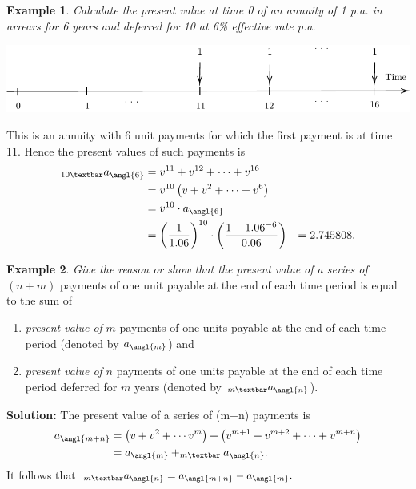 \documentclass[
]{book}
\theoremstyle{definition}
\theoremstyle{definition}
\newtheorem{example}{Example}[chapter]
\theoremstyle{definition}
\theoremstyle{definition}
\theoremstyle{remark}
\begin{document}
\begin{example}
\emph{Calculate the present value at time 0 of an annuity of 1 p.a. in
arrears for 6 years and deferred for 10 at 6\% effective rate p.a.}
\end{example}

\begin{center}\includegraphics{SCMA266Bookdownproj_files/figure-latex/tikz-ex18-1} \end{center}

This is an annuity with 6 unit payments for which the first payment is
at time 11. Hence the present values of such payments is
\[\begin{aligned}
    _{10 \textbar}a_\angl{6}
  &= v^{11} + v^{12} + \cdots +v^{16}  \\
    &= v^{10}  \left( v + v^2 + \cdots + v^6  \right) \\
    &= v^{10} \cdot  a_\angl{6} \\
    &= \left(\frac{1}{1.06}\right)^{10} \cdot \left( \frac{1- 1.06^{-6}}{0.06} \right)
    &= 2.745808.\end{aligned}\]

\begin{example}

\emph{Give the reason or show that the present value of a series of} \((n+m)\)
payments of one unit payable at the end of each time period is equal to
the sum of

\begin{enumerate}
\def\labelenumi{\arabic{enumi}.}
\item
  \emph{present value of} \(m\) payments of one units payable at the end of
  each time period (denoted by \(a_\angl{m}\)) and
\item
  \emph{present value of} \(n\) payments of one units payable at the end of
  each time period deferred for \(m\) years (denoted by
  \(_{m \textbar}a_\angl{n}\)).
\end{enumerate}

\end{example}

\textbf{Solution:} The present value of a series of (m+n) payments is
\[\begin{aligned}
a_\angl{m+n} &=  \left( v + v^2 + \cdots  v^m\right) + \left( v^{m+1} + v^{m+2} + \cdots +v^{m+n} \right) \\
&= a_\angl{m} + _{m \textbar}a_\angl{n}.\end{aligned}\] It follows that
\(_{m \textbar}a_\angl{n} = a_\angl{m+n} - a_\angl{m}.\)
\end{document}
